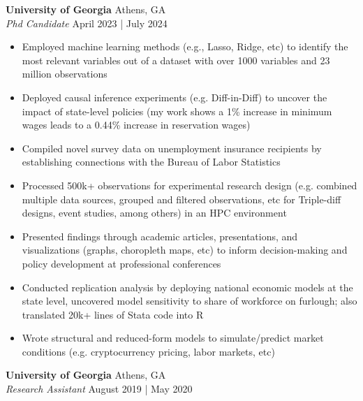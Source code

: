 \documentclass[a4paper]{article}
\begin{document}
\textbf{University of Georgia} \hfill Athens, GA\\
\textit{Phd Candidate} \hfill April 2023 | July 2024\\
\vspace{-1mm}
\begin{itemize} \itemsep 1pt
	\item Employed machine learning methods (e.g., Lasso, Ridge, etc) to identify the most relevant variables out of a dataset with over 1000 variables and 23 million observations%
	\item Deployed causal inference experiments (e.g. Diff-in-Diff) to uncover the impact of state-level policies (my work shows a 1\% increase in minimum wages leads to a 0.44\% increase in reservation wages)
	\item Compiled novel survey data on unemployment insurance recipients by establishing connections with the Bureau of Labor Statistics
	\item Processed 500k+ observations for experimental research design (e.g. combined multiple data sources, grouped and filtered observations, etc for Triple-diff designs, event studies, among others) in an HPC environment
	\item Presented findings through academic articles, presentations, and visualizations (graphs, choropleth maps, etc) to inform decision-making and policy development at professional conferences
	\item Conducted replication analysis by deploying national economic models at the state level, uncovered model sensitivity to share of workforce on furlough; also translated 20k+ lines of Stata code into R
      \item Wrote structural and reduced-form models to simulate/predict market conditions (e.g. cryptocurrency pricing, labor markets, etc)
\end{itemize}
\textbf{University of Georgia} \hfill Athens, GA\\
\textit{Research Assistant} \hfill August 2019 | May 2020\\
\vspace{-1mm}
\end{document}
